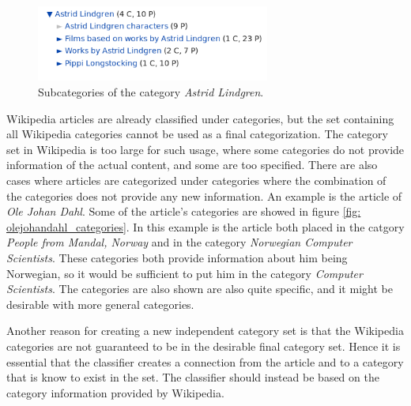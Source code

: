
\begin{figure}[H]
\centering
\includegraphics[height=2.5cm]{Chapters/Background/Astrid_Lindgren}
\caption{Subcategories of the category \emph{Astrid Lindgren}. }
\label{fig: subcat_lindgren}
\end{figure}

Wikipedia articles are already classified under categories, but the set containing all Wikipedia categories cannot be used as a final categorization. The category set in Wikipedia is too large for such usage, where some categories do not provide information of the actual content, and some are too specified. There are also cases where articles are categorized under categories where the combination of the categories does not provide any new information. An example is the article of \emph{Ole Johan Dahl}. Some of the article's categories are showed in figure \ref{fig: olejohandahl_categories}. In this example is the article both placed in the catgory \emph{People from Mandal, Norway} and in the category \emph{Norwegian Computer Scientists}. These categories both provide information about him being Norwegian, so it would be sufficient to put him in the category \emph{Computer Scientists}. The categories are also shown are also quite specific, and it might be desirable with more general categories. 




Another reason for creating a new independent category set is that the Wikipedia categories are not guaranteed to be in the desirable final category set. Hence it is essential that the classifier creates a connection from the article and to a category that is know to exist in the set. The classifier should instead be based on the category information provided by Wikipedia. 


